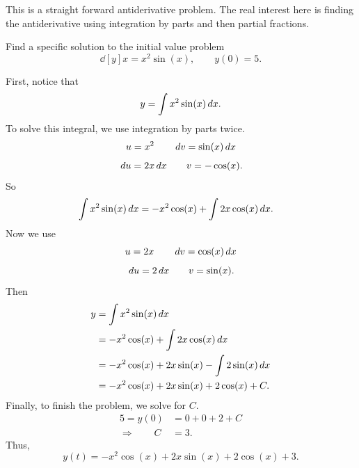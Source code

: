 \documentclass[]{ximera}
\begin{document}
\begin{instructorNotes}
This is a straight forward antiderivative problem.  
The real interest here is finding the antiderivative using integration by parts and then partial fractions.  
\end{instructorNotes}








\begin{problem}
Find a specific solution to the initial value problem
	\[
	\dd[y]{x} = x^2 \sin(x), \qquad y(0) = 5.
	\]
	
	\begin{freeResponse}
	First, notice that
		\[
		y = \int x^2 \sin(x) \,d x.
		\]
	To solve this integral, we use integration by parts twice.  
		{\color{red}
		\[
		u = x^2 		\qquad	\,d v = \sin(x) \,d x
		\]
		\[
		\,d u = 2x \,d x	\qquad	v = -\cos(x).
		\]
		}
	So
		\begin{align*}
		\int x^2 \sin(x) \,d x
		&= -x^2 \cos(x) + \int 2x \cos (x) \,d x.
		\end{align*}
	Now we use
		{\color{red}
		\[
		u = 2x 		\qquad	\,d v = \cos(x) \,d x
		\]
		\[
		\,d u = 2 \,d x	\qquad	v = \sin(x).
		\]
		}
	Then
		\begin{align*}
		y &= \int x^2 \sin(x) \,d x  \\
		&= -x^2 \cos(x) + \int 2x \cos (x) \,d x  \\
		&= -x^2 \cos(x) + 2x\sin(x) - \int 2\sin(x) \,d x  \\
		&= -x^2\cos(x) + 2x\sin(x) + 2\cos(x) + C.
		\end{align*}
	Finally, to finish the problem, we solve for $C$.  
		\begin{align*}
		5 = y(0) &= 0 + 0 + 2 + C  \\
		\Longrightarrow \qquad C &= 3.
		\end{align*}
	Thus,
		\[
		y(t) = -x^2\cos(x) + 2x\sin(x) + 2\cos(x) + 3.
		\]
	\end{freeResponse}
	
\end{problem}

\begin{instructorNotes}

\end{instructorNotes}
\end{document}
